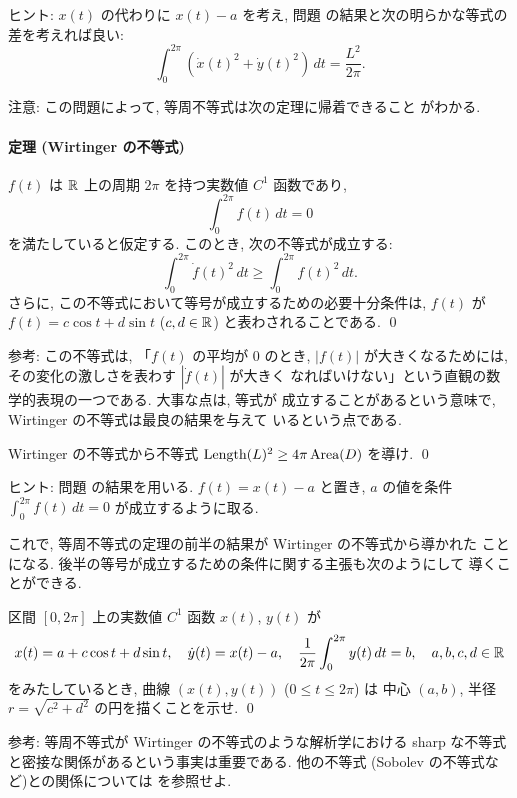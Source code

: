 \documentclass[12pt,twoside]{jarticle}
\def\Area{\mathop{\text{\rm Area}}\nolimits}
\def\Length{\mathop{\text{\rm Length}}\nolimits}
\def\R{{\Bbb R}} %
\begin{document}
\noindent ヒント: $x(t)$ の代わりに $x(t) - a$ を考え, %
問題  の結果と次の明らかな等式の差を考えれば良い:
\[
  \int_0^{2\pi} (\dot{x}(t)^2 + \dot{y}(t)^2)\,dt = \frac{L^2}{2\pi}.
\]

\noindent 注意: この問題によって, 等周不等式は次の定理に帰着できること
がわかる.

\paragraph{定理 (Wirtinger の不等式)}
$f(t)$ は $\R$ 上の周期 $2\pi$ を持つ実数値 $C^1$ 函数であり,
\[
  \int_0^{2\pi} f(t)\, dt = 0
\]%
を満たしていると仮定する. このとき, 次の不等式が成立する:
\[
  \int_0^{2\pi} \dot{f}(t)^2 \,dt \ge \int_0^{2\pi} f(t)^2\,dt.
\]%
さらに, この不等式において等号が成立するための必要十分条件は, $f(t)$ %
が $f(t) = c \cos t + d \sin t$ ($c,d \in \R$) と表わされることである. 
\qed

\noindent 参考: この不等式は, 「$f(t)$ の平均が $0$ のとき, $|f(t)|$ %
が大きくなるためには, その変化の激しさを表わす $|\dot{f}(t)|$ が大きく
なればいけない」という直観の数学的表現の一つである. 大事な点は, 等式が
成立することがあるという意味で, Wirtinger の不等式は最良の結果を与えて
いるという点である.

\begin{question}
  Wirtinger の不等式から不等式 $\Length(L)^2 \ge 4\pi \Area(D)$ を導け.
  \qed
\end{question}

\noindent ヒント: 問題  の結果を用いる. %
$f(t) = x(t) - a$ と置き, $a$ の値を条件 $\int_0^{2\pi} f(t)\, dt = 0$ 
が成立するように取る.

これで, 等周不等式の定理の前半の結果が Wirtinger の不等式から導かれた
ことになる. 後半の等号が成立するための条件に関する主張も次のようにして
導くことができる.

\begin{question}
  区間 $[0,2\pi]$ 上の実数値 $C^1$ 函数 $x(t)$, $y(t)$ が %
  \[
    x(t) = a + c \cos t + d \sin t,
    \quad
    \dot{y}(t) = x(t) - a,
    \quad
    \frac{1}{2\pi} \int_0^{2\pi} y(t)\,dt = b,
    \quad
    a,b,c,d \in \R
  \]%
  をみたしているとき, 曲線 $(x(t), y(t))$ ($0 \le t \le 2\pi$) は%
  中心 $(a,b)$, 半径 $r = \sqrt{c^2 + d^2}$ の円を描くことを示せ. \qed
\end{question}

\noindent 参考: 等周不等式が Wirtinger の不等式のような解析学における
sharp な不等式と密接な関係があるという事実は重要である. 他の不等式
(Sobolev の不等式など)との関係については \cite{Urakawa}{} を参照せよ.
\end{document}
